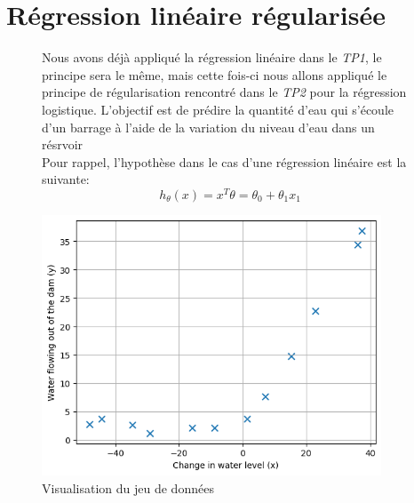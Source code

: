 \section{Régression linéaire régularisée}

\begin{figure}[!h]
    \begin{minipage}{.48\linewidth}
        Nous avons déjà appliqué la régression linéaire dans le \textit{TP1}, le principe sera le même, mais cette fois-ci nous 
        allons appliqué le principe de régularisation rencontré dans le \textit{TP2} pour la régression logistique. L'objectif 
        est de prédire la quantité d'eau qui s'écoule d'un barrage à l'aide de la variation du niveau d'eau dans un résrvoir\\

        Pour rappel, l'hypothèse dans le cas d'une régression linéaire est la suivante:
        \begin{equation}\label{eq:regression_linear}
            h_\theta(x) = x^T \theta =\theta_0 + \theta_1 x_1
        \end{equation}

    \end{minipage}\hfill
    \begin{minipage}{.48\linewidth}
        \begin{center}
            \includegraphics[width=0.9\textwidth]{./img/3.1.png}
            \caption{\label{fig:data-plot}Visualisation du jeu de données}  
        \end{center}
    \end{minipage}
\end{figure}


